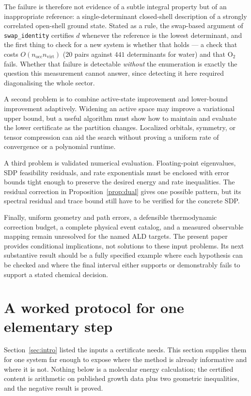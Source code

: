 \documentclass[11pt,a4paper]{article}
\theoremstyle{plain}
\theoremstyle{definition}
\theoremstyle{remark}
\providecommand{\path}[1]{\texttt{#1}}
\begin{document}
The failure is therefore not evidence of a subtle integral property but of an
inappropriate reference: a single-determinant closed-shell description of a
strongly correlated open-shell ground state. Stated as a rule, the swap-based
argument of \path{swap_identity} certifies $d$ whenever the reference is the
lowest determinant, and the first thing to check for a new system is whether that
holds --- a check that costs $O(n_{\mathrm{occ}}n_{\mathrm{virt}})$
($20$ pairs against $441$ determinants for water) and that O$_2$ fails. Whether
that failure is detectable \emph{without} the enumeration is exactly the question
this measurement cannot answer, since detecting it here required diagonalising the
whole sector.

A second problem is to combine active-state improvement and lower-bound
improvement adaptively. Widening an active space may improve a variational
upper bound, but a useful algorithm must show how to maintain and evaluate
the lower certificate as the partition changes. Localized orbitals, symmetry,
or tensor compression can aid the search without proving a uniform rate of
convergence or a polynomial runtime.

A third problem is validated numerical evaluation. Floating-point eigenvalues,
SDP feasibility residuals, and rate exponentials must be enclosed with error
bounds tight enough to preserve the desired energy and rate inequalities.
The residual correction in Proposition~\ref{prop:dual} gives one possible
pattern, but its spectral residual and trace bound still have to be verified
for the concrete SDP.

Finally, uniform geometry and path errors, a defensible thermodynamic
correction budget, a complete physical event catalog, and a measured
observable mapping remain unresolved for the named ALD targets. The present
paper provides conditional implications, not solutions to these input
problems. Its next substantive result should be a fully specified example
where each hypothesis can be checked and where the final interval either
supports or demonstrably fails to support a stated chemical decision.

\section{A worked protocol for one elementary step}
\label{sec:worked}

Section~\ref{sec:intro} listed the inputs a certificate needs. This section
supplies them for one system far enough to expose where the method is already
informative and where it is not. Nothing below is a molecular energy
calculation; the certified content is arithmetic on published growth data plus
two geometric inequalities, and the negative result is proved.
\end{document}
